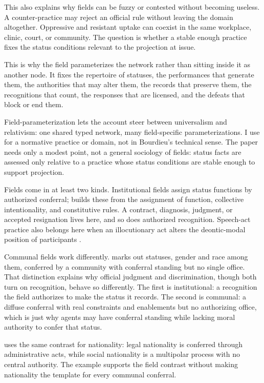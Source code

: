 \documentclass[12pt]{article}
\begin{document}
This also explains why fields can be fuzzy or contested without becoming useless. A counter-practice may reject an official rule without leaving the domain altogether. Oppressive and resistant uptake can coexist in the same workplace, clinic, court, or community. The question is whether a stable enough practice fixes the status conditions relevant to the projection at issue.

This is why the field parameterizes the network rather than sitting inside it as another node. It fixes the repertoire of statuses, the performances that generate them, the authorities that may alter them, the records that preserve them, the recognitions that count, the responses that are licensed, and the defeats that block or end them.

Field-parameterization lets the account steer between universalism and relativism: one shared typed network, many field-specific parameterizations. I use  for a normative practice or domain, not in Bourdieu's technical sense. The paper needs only a modest point, not a general sociology of fields: status facts are assessed only relative to a practice whose status conditions are stable enough to support projection.

Fields come in at least two kinds. Institutional fields assign status functions by authorized conferral; \textcite{searle1995Construction} builds these from the assignment of function, collective intentionality, and constitutive rules. A contract, diagnosis, judgment, or accepted resignation lives here, and so does authorized recognition. Speech-act practice also belongs here when an illocutionary act alters the deontic-modal position of participants \citep{sbisa2023OnIllocutionaryTypes}.

Communal fields work differently. \textcite{asta2018Categories} marks out statuses, gender and race among them, conferred by a community with conferral standing but no single office. That distinction explains why official judgment and discrimination, though both turn on recognition, behave so differently. The first is institutional: a recognition the field authorizes to make the status it records. The second is communal: a diffuse conferral with real constraints and enablements but no authorizing office, which is just why agents may have conferral standing while lacking moral authority to confer that status.

\textcite[pp.~42--43]{behrensen2018MakingUpPeoples} uses the same contrast for nationality: legal nationality is conferred through administrative acts, while social nationality is a multipolar process with no central authority. The example supports the field contrast without making nationality the template for every communal conferral.
\end{document}
